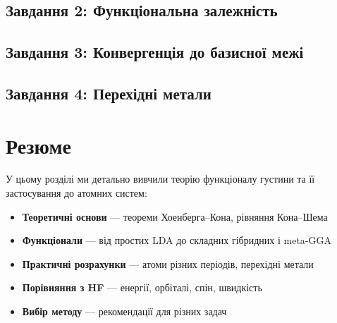 
\subsection{Завдання 2: Функціональна залежність}



\subsection{Завдання 3: Конвергенція до базисної межі}


\subsection{Завдання 4: Перехідні метали}


\section{Резюме}

У цьому розділі ми детально вивчили теорію функціоналу густини та її застосування до атомних систем:

\begin{itemize}
    \item \textbf{Теоретичні основи} --- теореми Хоенберга--Кона, рівняння Кона--Шема
    \item \textbf{Функціонали} --- від простих LDA до складних гібридних і meta-GGA
    \item \textbf{Практичні розрахунки} --- атоми різних періодів, перехідні метали
    \item \textbf{Порівняння з HF} --- енергії, орбіталі, спін, швидкість
    \item \textbf{Вибір методу} --- рекомендації для різних задач
\end{itemize}

